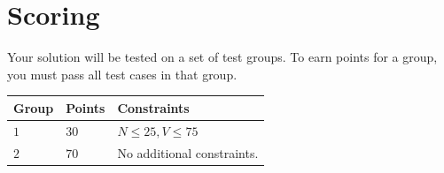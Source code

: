 \section*{Scoring}
Your solution will be tested on a set of test groups.
To earn points for a group, you must pass all test cases in that group.

\noindent
\begin{tabular}{| l | l | p{12cm} |}
  \hline
  \textbf{Group} & \textbf{Points} & \textbf{Constraints} \\ \hline
  $1$    & $30$       & $N \leq 25, V \leq 75$ \\ \hline
  $2$    & $70$       & No additional constraints. \\ \hline
\end{tabular}

